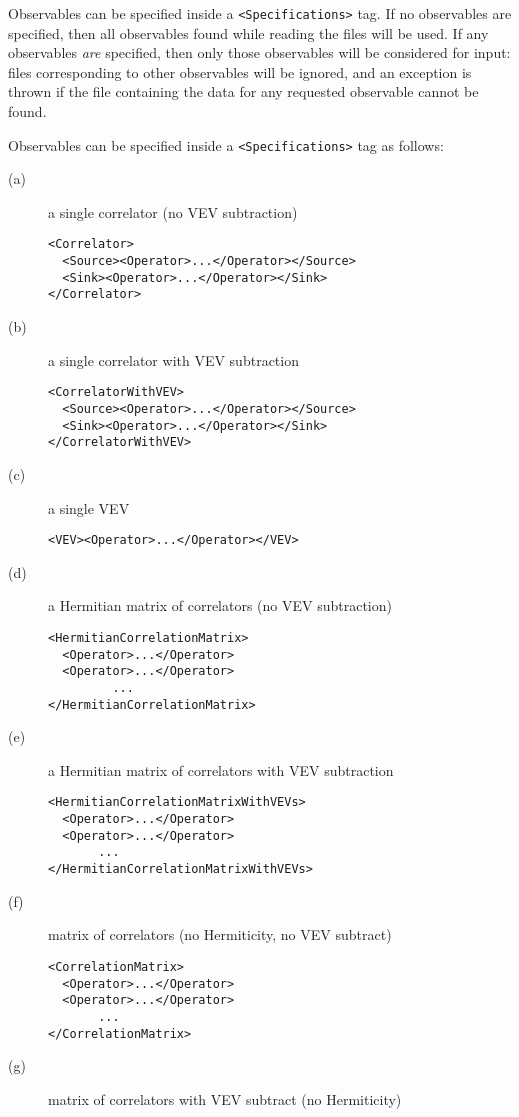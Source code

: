 \documentclass[12pt]{article}
\newcommand{\vb}{\texttt}
\begin{document}
Observables can be specified inside a \vb{<Specifications>} tag.  If no 
observables are specified, then all observables found while reading the 
files will be used.  If any observables \textit{are} specified, then only 
those observables will be considered for input: files corresponding to other
observables will be ignored, and an exception is thrown if the file 
containing the data for any requested observable cannot be found.

Observables can be specified inside a \vb{<Specifications>} tag as follows:
\begin{description}
\item[(a)]
a single correlator (no VEV subtraction)
\begin{verbatim}
<Correlator>
  <Source><Operator>...</Operator></Source>
  <Sink><Operator>...</Operator></Sink>
</Correlator>
\end{verbatim}
\item[(b)]
 a single correlator with VEV subtraction
\begin{verbatim}
<CorrelatorWithVEV>
  <Source><Operator>...</Operator></Source>
  <Sink><Operator>...</Operator></Sink>
</CorrelatorWithVEV>
\end{verbatim}
\item[(c)]
 a single VEV
\begin{verbatim}
<VEV><Operator>...</Operator></VEV>
\end{verbatim}
\item[(d)]
  a Hermitian matrix of correlators (no VEV subtraction)
\begin{verbatim}
<HermitianCorrelationMatrix>
  <Operator>...</Operator>
  <Operator>...</Operator>
         ...
</HermitianCorrelationMatrix>
\end{verbatim}
\item[(e)]
 a Hermitian matrix of correlators with VEV subtraction
\begin{verbatim}
<HermitianCorrelationMatrixWithVEVs>
  <Operator>...</Operator>        
  <Operator>...</Operator>
       ...                  
</HermitianCorrelationMatrixWithVEVs>
\end{verbatim}
\item[(f)]
 matrix of correlators (no Hermiticity, no VEV subtract)
\begin{verbatim}
<CorrelationMatrix>
  <Operator>...</Operator>
  <Operator>...</Operator>
       ...     
</CorrelationMatrix>   
\end{verbatim}
\item[(g)]
 matrix of correlators with VEV subtract (no Hermiticity)

\end{description}
\end{document}
